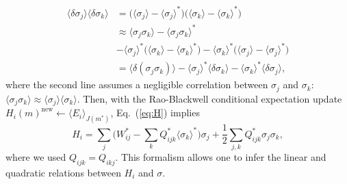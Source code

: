 \documentclass[prx,twocolumn,twoside,showpacs,superscriptaddress]{revtex4-1}
\begin{document}
\begin{align}
\langle \delta \sigma_j \rangle \langle \delta \sigma_k \rangle &= \big( \langle \sigma_j \rangle - \langle \sigma_j \rangle^* \big) \big( \langle \sigma_k \rangle - \langle \sigma_k \rangle^* \big) \nonumber \\
&\approx \langle \sigma_j \sigma_k \rangle - \langle \sigma_j \sigma_k \rangle^* \nonumber \\
& - \langle \sigma_j \rangle^* \big( \langle \sigma_k \rangle - \langle \sigma_k \rangle^* \big) - \langle \sigma_k \rangle^* \big( \langle \sigma_j \rangle - \langle \sigma_j \rangle^* \big) \nonumber \\
&= \langle \delta (\sigma_j \sigma_k) \rangle - \langle \sigma_j \rangle^* \langle \delta \sigma_k \rangle - \langle \sigma_k \rangle^* \langle \delta \sigma_j \rangle,
\end{align}
where the second line assumes a negligible correlation between $\sigma_j$ and $\sigma_k$:
$\langle \sigma_j \sigma_k \rangle \approx \langle \sigma_j \rangle \langle \sigma_k \rangle$.
Then, with the Rao-Blackwell conditional expectation update $H_i(m)^{\textrm{new}} \leftarrow \langle E_i \rangle_{J(m^*)}$, Eq.~(\ref{eq:H}) implies 
\begin{equation}
H_i = \sum_j \bigg(W_{ij}^* - \sum_k Q_{ijk}^* \langle \sigma_k \rangle^* \bigg) \sigma_j + \frac{1}{2} \sum_{j,k} Q_{ijk}^* \sigma_j \sigma_k,
\end{equation}
where we used $Q_{ijk}=Q_{ikj}$.
This formalism allows one to infer the linear and quadratic relations between $H_i$ and $\sigma$.
\end{document}
